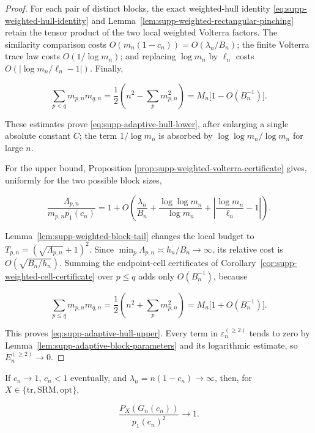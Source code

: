 \begin{proof}
For each pair of distinct blocks, the exact weighted-hull identity
\eqref{eq:supp-weighted-hull-identity} and
Lemma~\ref{lem:supp-weighted-rectangular-pinching} retain the tensor product
of the two local weighted Volterra factors.  The similarity comparison costs
\(O(m_n(1-c_n))=O(\lambda_n/B_n)\); the finite Volterra trace law costs
\(O(1/\log m_n)\); and replacing \(\log m_n\) by \(\ell_n\) costs
\(O(|\log m_n/\ell_n-1|)\).  Finally,

\[
 \sum_{p<q}m_{p,n}m_{q,n}
 =\frac12\left(n^2-\sum_pm_{p,n}^2\right)
 =M_n\bigl[1-O(B_n^{-1})\bigr].
\]

These estimates prove \eqref{eq:supp-adaptive-hull-lower}, after enlarging a
single absolute constant \(C\); the term \(1/\log m_n\) is absorbed by
\(\log\log m_n/\log m_n\) for large \(n\).

For the upper bound, Proposition
\ref{prop:supp-weighted-volterra-certificate} gives, uniformly for the two
possible block sizes,

\[
 \frac{\Lambda_{p,n}}{m_{p,n}p_1(c_n)}
 =1+O\!\left(
 \frac{\lambda_n}{B_n}
 +\frac{\log\log m_n}{\log m_n}
 +\left|\frac{\log m_n}{\ell_n}-1\right|
 \right).
\]

Lemma~\ref{lem:supp-weighted-block-tail} changes the local budget to
\(T_{p,n}=(\sqrt{\Lambda_{p,n}}+1)^2\).  Since
\(\min_p\Lambda_{p,n}\asymp h_n/B_n\to\infty\), its relative cost is
\(O(\sqrt{B_n/h_n})\).  Summing the endpoint-cell certificates of
Corollary~\ref{cor:supp-weighted-cell-certificate} over \(p\le q\) adds only
\(O(B_n^{-1})\), because

\[
 \sum_{p\le q}m_{p,n}m_{q,n}
 =\frac12\left(n^2+\sum_pm_{p,n}^2\right)
 =M_n\bigl[1+O(B_n^{-1})\bigr].
\]

This proves \eqref{eq:supp-adaptive-hull-upper}.  Every term in
\(\varepsilon_n^{(\ge2)}\) tends to zero by
Lemma~\ref{lem:supp-adaptive-block-parameters} and its logarithmic estimate,
so \(E_n^{(\ge2)}\to0\).
\end{proof}

\begin{theorem}
\label{thm:supp-moving-outer}
If \(c_n\to1\), \(c_n<1\) eventually, and
\(\lambda_n=n(1-c_n)\to\infty\), then, for
\(X\in\{\mathrm{tr},\mathrm{SRM},\mathrm{opt}\}\),

\[
 \frac{P_X(G_n(c_n))}{p_1(c_n)^2}\longrightarrow1.
\]
\end{theorem}

